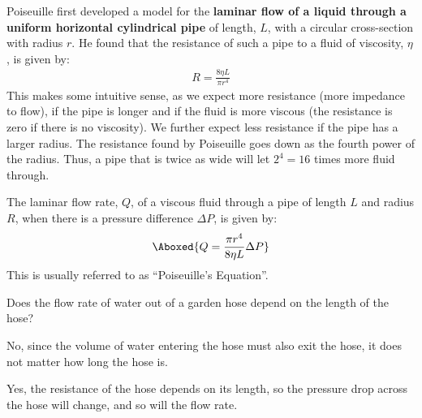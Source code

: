 {{Poiseuille first developed a model for the \textbf{laminar flow of a liquid through a uniform horizontal cylindrical pipe} of length, $L$, with a circular cross-section with radius $r$. He found that the resistance of such a pipe to a fluid of viscosity, $\eta $, is given by:
\begin{align*}
R = \frac{8\eta L}{\pi r^4}
\end{align*}
This makes some intuitive sense, as we expect more resistance (more impedance to flow), if the pipe is longer and if the fluid is more viscous (the resistance is zero if there is no viscosity). We further expect less resistance if the pipe has a larger radius. The resistance found by Poiseuille goes down as the fourth power of the radius. Thus, a pipe that is twice as wide will let $2^4=16$ times more fluid through. 

The laminar flow rate, $Q$, of a viscous fluid through a pipe of length $L$ and radius $R$, when there is a pressure difference $\Delta P$, is given by:
\begin{align}
\Aboxed{Q =  \frac{\pi r^4}{8\eta L}\Delta P}
\end{align}
This is usually referred to as ``Poiseuille's Equation''.

\begin{checkpoint}
\begin{MCquestion}{Does the flow rate of water out of a garden hose depend on the length of the hose?}
\item No, since the volume of water entering the hose must also exit the hose, it does not matter how long the hose is. 
\item Yes, the resistance of the hose depends on its length, so the pressure drop across the hose will change, and so will the flow rate. \correct
\end{MCquestion}
\end{checkpoint}

}}
